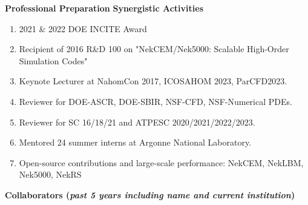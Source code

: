 \documentclass[11pt,letterpaper,english]{article}
\begin{document}
\begin{flushleft} {\bf Professional Preparation}
\vspace{.04in}
{\bf Synergistic Activities}
\vspace{-6pt}
\begin{enumerate} \itemsep1pt \parskip0pt 
 \item 2021 \& 2022 DOE INCITE Award
 \item Recipient of 2016 R\&D 100 on "NekCEM/Nek5000: Scalable High-Order Simulation Codes"
 \item Keynote Lecturer at NahomCon 2017, ICOSAHOM 2023, ParCFD2023.
 \item Reviewer for DOE-ASCR, DOE-SBIR, NSF-CFD, NSF-Numerical PDEs.
 \item Reviewer for SC 16/18/21 and ATPESC 2020/2021/2022/2023.
 \item Mentored 24 summer interns at Argonne National Laboratory.
 \item Open-source contributions and large-scale performance: NekCEM, NekLBM, Nek5000, NekRS
%
\end{enumerate}

\vspace{-6pt}
{\bf Collaborators ({\emph{past 5 years including name and current institution}})}
{\parindent 16pt

}
\end{flushleft}
\end{document}
